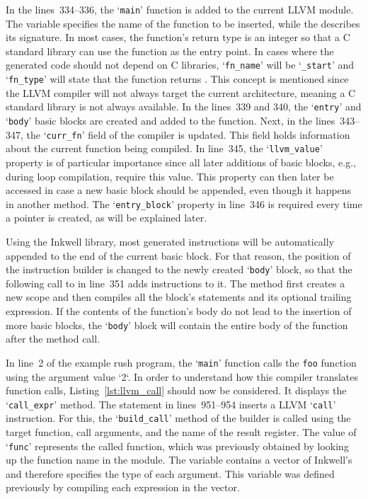 In the lines~334--336, the `\texttt{main}' function is added to the current LLVM module.
The variable  specifies the name of the function to be inserted, while the  describes its signature.
In most cases, the  function's return type is an integer so that a C standard library can use the function as the entry point.
In cases where the generated code should not depend on C libraries, `\Verb|fn_name|' will be `\Verb|_start|' and `\Verb|fn_type|' will state that the function returns .
This concept is mentioned since the LLVM compiler will not always target the current architecture,
meaning a C standard library is not always available.
In the lines~339 and 340, the `\texttt{entry}' and `\texttt{body}' basic blocks are created and added to the function.
Next, in the lines~343--347, the `\Verb|curr_fn|' field of the compiler is updated.
This field holds information about the current function being compiled.
In line~345, the `\Verb|llvm_value|' property is of particular importance since all later additions of basic blocks, e.g., during loop compilation, require this value.
This property can then later be accessed in case a new basic block should be appended, even though it happens in another method.
The `\Verb|entry_block|' property in line~346 is required every time a pointer is created, as will be explained later.

Using the Inkwell library, most generated instructions will be automatically appended to the end of the current basic block.
For that reason, the position of the instruction builder is changed to the newly created `\texttt{body}' block,
so that the following call to  in line~351 adds instructions to it.
The  method first creates a new scope and then compiles all the block's statements and its optional trailing expression.
If the contents of the  function's body do not lead to the insertion of more basic blocks,
the `\texttt{body}' block will contain the entire body of the function after the method call.


In line~2 of the example rush program, the `\texttt{main}' function calls the \texttt{foo} function using the argument value `2`.
In order to understand how this compiler translates function calls, Listing~\ref{lst:llvm_call} should now be considered.
It displays the `\Verb|call_expr|' method.
The statement in lines~951--954 inserts a LLVM `\texttt{call}' instruction.
For this, the `\Verb|build_call|' method of the builder is called using the target function, call arguments, and the name of the result register.
The value of `\texttt{func}' represents the called function, which was previously obtained by looking up the function name in the module.
The  variable contains a vector of Inkwell's  and therefore specifies the type of each argument.
This variable was defined previously by compiling each expression in the  vector.

